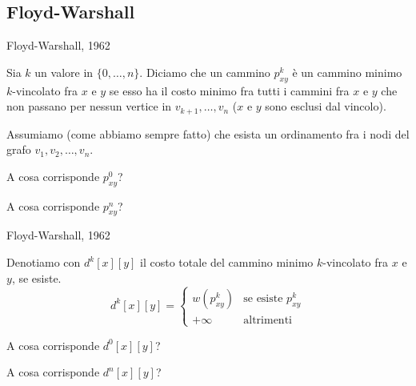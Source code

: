 \subsection{Floyd-Warshall}

\vspace{-9pt}
\begin{frame}{Floyd-Warshall, 1962}

\vspace{-9pt}
\begin{myboxtitle}
Sia $k$ un valore in $\{0,\ldots,n\}$. Diciamo che un cammino 
$p_{xy}^k$ è un \alert{cammino minimo $k$-vincolato} fra $x$ e $y$ 
se esso ha il costo minimo fra tutti i cammini fra $x$ e $y$ 
che non passano per nessun vertice in $v_{k+1}, \ldots, v_n$
($x$ e $y$ sono esclusi dal vincolo).
\end{myboxtitle}

\begin{myboxtitle}[Note]
Assumiamo (come abbiamo sempre fatto) che esista un ordinamento fra i nodi
del grafo $v_1, v_2, \ldots, v_n$.
\end{myboxtitle}

\begin{myboxtitle}[Domande]
\BI
\item A cosa corrisponde $p^0_{xy}$?
\item A cosa corrisponde $p^n_{xy}$?
\EI
\end{myboxtitle}

\end{frame}

\begin{frame}{Floyd-Warshall, 1962}

\vspace{-9pt}
\begin{myboxtitle}
Denotiamo con $d^k[x][y]$ il costo totale del cammino minimo $k$-vincolato
fra $x$ e $y$, se esiste.
\[
  d^k[x][y] = \begin{cases}
    w(p_{xy}^k) & \textrm{se esiste $p_{xy}^k$}\\
    +\infty & \textrm{altrimenti}
  \end{cases}
\]
\end{myboxtitle}

\begin{myboxtitle}[Domande]
\BIL
\item A cosa corrisponde $d^0[x][y]$?
\item A cosa corrisponde $d^n[x][y]$?
\EIL
\end{myboxtitle}

\end{frame}

